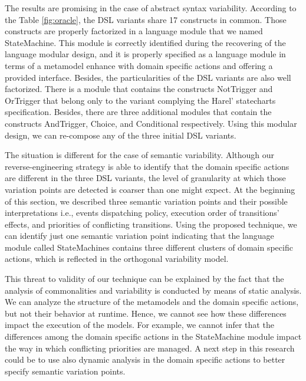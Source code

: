 The results are promising in the case of abstract syntax variability. According to the Table \ref{fig:oracle}, the DSL variants share 17 constructs in common. Those constructs are properly factorized in a language module that we named StateMachine. This module is correctly identified during the recovering of the language modular design, and it is properly specified as a language module in terms of a metamodel enhance with domain specific actions and offering a provided interface. Besides, the particularities of the DSL variants are also well factorized. There is a module that contains the constructs NotTrigger and OrTrigger that belong only to the variant complying the Harel' statecharts specification. Besides, there are three additional modules that contain the constructs AndTrigger, Choice, and Conditional respectively. Using this modular design, we can re-compose any of the three initial DSL variants.

The situation is different for the case of semantic variability. Although our reverse-engineering strategy is able to identify that the domain specific actions are different in the three DSL variants, the level of granularity at which those variation points are detected is coarser than one might expect. At the beginning of this section, we described three semantic variation points and their possible interpretations i.e., events dispatching policy, execution order of transitions' effects, and priorities of conflicting transitions. Using the proposed technique, we can identify just one semantic variation point indicating that the language module called StateMachines contains three different clusters of domain specific actions, which is reflected in the orthogonal variability model.

This threat to validity of our technique can be explained by the fact that the analysis of commonalities and variability is conducted by means of static analysis. We can analyze the structure of the metamodels and the domain specific actions, but not their behavior at runtime. Hence, we cannot see how these differences impact the execution of the models. For example, we cannot infer that the differences among the domain specific actions in the StateMachine module impact the way in which conflicting priorities are managed. A next step in this research could be to use also dynamic analysis in the domain specific actions to better specify semantic variation points.

